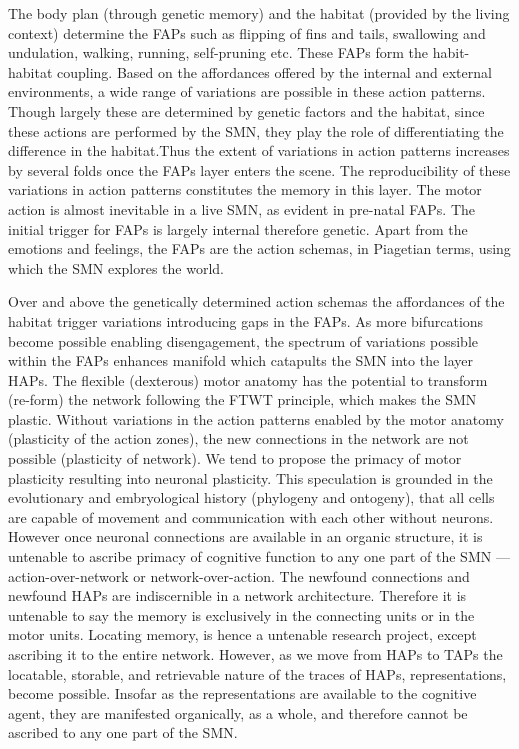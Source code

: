 {{{{{The body plan (through genetic memory) and the habitat (provided by the living context) determine the FAPs such as flipping of fins and tails, swallowing and undulation, walking, running, self-pruning etc. These FAPs form the habit-habitat coupling. Based on the affordances offered by the internal and external environments, a wide range of variations are possible in these action patterns. Though largely these are determined by genetic factors and the habitat, since these actions are performed by the SMN, they play the role of differentiating the difference in the habitat.Thus the extent of variations in action patterns increases by several folds once the FAPs layer enters the scene. The reproducibility of these variations in action patterns constitutes the memory in this layer. The motor action is almost inevitable in a live SMN, as evident in pre-natal FAPs. The initial trigger for FAPs is largely internal therefore genetic. Apart from the emotions and feelings, the FAPs are the action schemas, in Piagetian terms, using which the SMN explores the world. 

Over and above the genetically determined action schemas the affordances of the habitat trigger variations introducing gaps in the FAPs. As more bifurcations become possible enabling disengagement, the spectrum of variations possible within the FAPs enhances manifold which catapults the SMN into the layer HAPs. The flexible (dexterous) motor anatomy has the potential to transform (re-form) the network following the FTWT principle, which makes the SMN plastic. Without variations in the action patterns enabled by the motor anatomy (plasticity of the action zones), the new connections in the network are not possible (plasticity of network). We tend to propose the primacy of motor plasticity resulting into neuronal plasticity. This speculation is grounded in the evolutionary and embryological history (phylogeny and ontogeny), that all cells are capable of movement and communication with each other without neurons. However once neuronal connections are available in an organic structure, it is untenable to ascribe primacy of cognitive function to any one part of the SMN --- action-over-network or network-over-action. The newfound connections and newfound HAPs are indiscernible in a network architecture. Therefore it is untenable to say the memory is exclusively in the connecting units or in the motor units. Locating memory, is hence a untenable research project, except ascribing it to the entire network. However, as we move from HAPs to TAPs the locatable, storable, and retrievable nature of the traces of HAPs, representations, become possible. Insofar as the representations are available to the cognitive agent, they are manifested organically, as a whole, and therefore cannot be ascribed to any one part of the SMN. 

}}}}}
